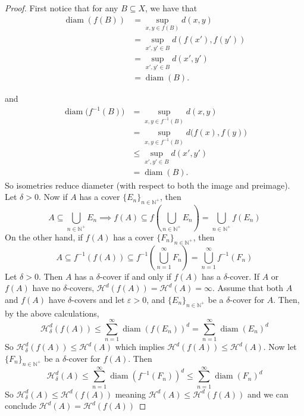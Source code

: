 \documentclass{article}
\theoremstyle{plain}
\theoremstyle{definition}
\DeclareMathOperator{\diam}{diam}
\theoremstyle{remark}
\begin{document}
\begin{proof}
First notice that for any $ B \subseteq X$, we have that \begin{align*}
\operatorname{diam}(f(B)) 
  &= \sup_{x,y \in f(B)} d(x,y) \\
  &= \sup_{x',y' \in B} d\!\left(f(x'), f(y')\right) \\
  &= \sup_{x',y' \in B} d(x',y') \\
  &= \operatorname{diam}(B).
\end{align*}

and 
\begin{align*}
\operatorname{diam}\!\big(f^{-1}(B)\big) 
  &= \sup_{x,y \in f^{-1}(B)} d(x,y) \\[6pt]
  &= \sup_{x,y \in f^{-1}(B)} d\big(f(x), f(y)\big) \\[6pt]
  &\leq \sup_{x',y' \in B} d(x',y') \\[6pt]
  &= \operatorname{diam}(B).
\end{align*}
So isometries reduce diameter (with respect to both the image and preimage).
Let $\delta >0$. Now if $A$ has a cover $\{E_n\}_{n\in \mathbb{N}^+}$, then \[
A \subseteq \bigcup \limits _{n\in \mathbb{N}^+} E_n \implies f(A) \subseteq f \left ( \bigcup \limits _{n\in \mathbb{N}^+} E_n\right ) = \bigcup \limits _{n \in \mathbb{N}^+} f(E_n)
\]
On the other hand, if $f(A)$ has a cover $\{F_n\}_{n\in \mathbb{N}^+}$, then \[
A \subseteq f^{-1}(f(A)) \subseteq f^{-1} \left ( \bigcup \limits _{n=1}^{\infty} F_n\right ) = \bigcup \limits _{n=1}^{\infty} f^{-1}(F_n)
\]
Let $\delta > 0$. Then $A$ has a $\delta$-cover if and only if $f(A)$ has a $\delta$-cover. If $A$ or $f(A)$ have no $\delta$-covers, $\mathcal{H}^d(f(A)) = \mathcal{H}^d(A) = \infty$. Assume that both $A$ and $f(A)$ have $\delta$-covers and let $\varepsilon > 0$, and $\{E_n\}_{n\in \mathbb{N}^+}$ be a $\delta$-cover for $A$. Then, by the above calculations, \[
\mathcal{H}^d_\delta (f(A)) \le \sum \limits _{n=1}^{\infty} \diam (f(E_n))^d = \sum \limits _{n=1}^{\infty} \diam (E_n)^d
\]
So $\mathcal{H}_\delta^d(f(A)) \le \mathcal{H}^d(A)$ which implies $\mathcal{H}^d(f(A)) \le \mathcal{H}^d(A)$. Now let $\{F_n\}_{n\in \mathbb{N}^+}$ be a $\delta$-cover for $f(A)$. Then \[
\mathcal{H}^d_\delta (A) \le \sum \limits _{n=1}^{\infty} \diam (f^{-1}(F_n))^d \le \sum \limits _{n=1}^{\infty} \diam (F_n)^d 
\]
So $\mathcal{H}^d_\delta(A) \le \mathcal{H}^d(f(A))$ meaning $\mathcal{H}^d(A) \le \mathcal{H}^d(f(A))$ and we can conclude $ \mathcal{H}^d(A)  =\mathcal{H}^d(f(A))$
\end{proof}
\end{document}
